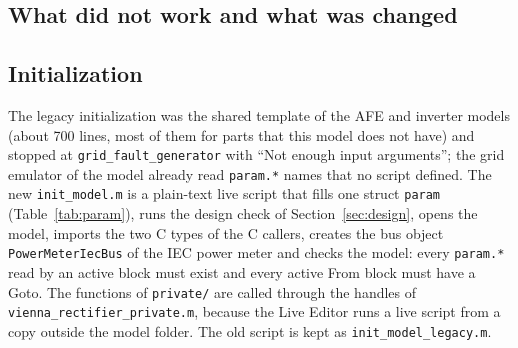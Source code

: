 \documentclass[11pt,a4paper]{scrartcl}
\newcommand{\code}[1]{\texttt{#1}}
\begin{document}
\begin{onehalfspace}
\section{What did not work and what was changed}
\label{sec:changes}

\subsection{Initialization}
\label{sec:init}

The legacy initialization was the shared template of the AFE and inverter models (about 700 lines, most of them for parts that this model does not have) and stopped at \code{grid\_fault\_generator} with ``Not enough input arguments''; the grid emulator of the model already read \code{param.*} names that no script defined. The new \code{init\_model.m} is a plain-text live script that fills one struct \code{param} (Table~\ref{tab:param}), runs the design check of Section~\ref{sec:design}, opens the model, imports the two C types of the C callers, creates the bus object \code{PowerMeterIecBus} of the IEC power meter and checks the model: every \code{param.*} read by an active block must exist and every active From block must have a Goto. The functions of \code{private/} are called through the handles of \code{vienna\_rectifier\_private.m}, because the Live Editor runs a live script from a copy outside the model folder. The old script is kept as \code{init\_model\_legacy.m}.


\end{onehalfspace}
\end{document}
